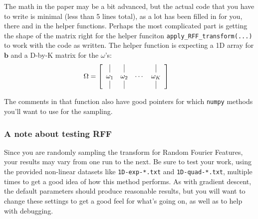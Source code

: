 \documentclass{article} %
\begin{document}
The math in the paper may be a bit advanced, but the actual code that you have to write is minimal (less than 5 lines total), 
as a lot has been filled in for you, there and in the helper functions. Perhaps the most complicated part is getting the 
shape of the matrix right for the helper funciton \texttt{apply\_RFF\_transform(...)} to work with the code as written. The 
helper function is expecting a 1D array for 
\(\mathbf{b}\) and a D-by-K matrix for the \(\omega\)'s:
\begin{align*}
	\Omega &= \left[\begin{array}{cccc}\vrule&\vrule& &\vrule\\\omega_1&\omega_2&\cdots&\omega_K\\\vrule&\vrule& &\vrule\end{array}\right]
\end{align*}

The comments in that function also have good pointers for which \texttt{numpy} methods you'll want to use for the sampling.

\subsubsection*{A note about testing RFF}
Since you are randomly sampling the transform for Random Fourier Features, your results may vary from one run to the next. Be 
sure to test your work, using the provided non-linear datasets like \texttt{1D-exp-*.txt} and \texttt{1D-quad-*.txt}, 
multiple times to get a good idea of how this method performs. As with gradient descent, the default parameters should 
produce reasonable results, but you will want to change these settings to get a good feel for what's going on, as well as to 
help with debugging.
\end{document}

